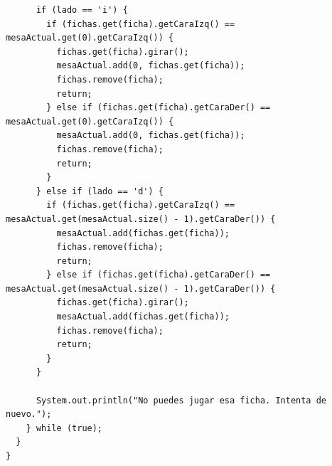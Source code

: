 \documentclass[12pt]{article}
\begin{document}
\begin{lstlisting}
      if (lado == 'i') {
        if (fichas.get(ficha).getCaraIzq() == mesaActual.get(0).getCaraIzq()) {
          fichas.get(ficha).girar();
          mesaActual.add(0, fichas.get(ficha));
          fichas.remove(ficha); 
          return;
        } else if (fichas.get(ficha).getCaraDer() == mesaActual.get(0).getCaraIzq()) {
          mesaActual.add(0, fichas.get(ficha));
          fichas.remove(ficha);
          return;
        }
      } else if (lado == 'd') {
        if (fichas.get(ficha).getCaraIzq() == mesaActual.get(mesaActual.size() - 1).getCaraDer()) {
          mesaActual.add(fichas.get(ficha));
          fichas.remove(ficha);
          return;
        } else if (fichas.get(ficha).getCaraDer() == mesaActual.get(mesaActual.size() - 1).getCaraDer()) {
          fichas.get(ficha).girar();
          mesaActual.add(fichas.get(ficha));
          fichas.remove(ficha);
          return;
        }
      }

      System.out.println("No puedes jugar esa ficha. Intenta de nuevo.");
    } while (true);
  }
}
  \end{lstlisting}
\end{document}
